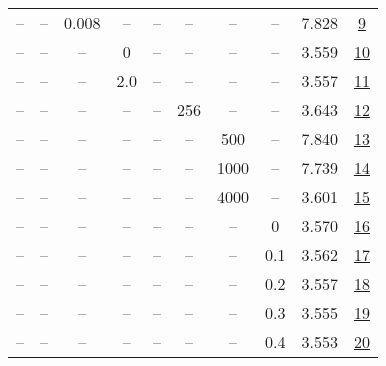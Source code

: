 \begin{table}[H]
\begin{tabular}{cccccccccc}
-- & -- & 0.008 & -- & -- & -- & -- & -- & 7.828 & \href{https://wandb.ai/stanford-mercury/optimizer-scaling/runs/sweep-130m-2B-lionaa59dalr0.008-wd0.7-minlr0-warmup2000-b10.9-b2-37a612}{9} \\
-- & -- & -- & 0 & -- & -- & -- & -- & 3.559 & \href{https://wandb.ai/stanford-mercury/optimizer-scaling/runs/sweep-130m-2B-lionf16ceclr0.002-wd0.7-minlr0-warmup2000-b10.9-b2-3511a1}{10} \\
-- & -- & -- & 2.0 & -- & -- & -- & -- & 3.557 & \href{https://wandb.ai/stanford-mercury/optimizer-scaling/runs/sweep-130m-2B-lion393849lr0.002-wd0.7-minlr0-warmup2000-b10.9-b2-41288e}{11} \\
-- & -- & -- & -- & -- & 256 & -- & -- & 3.643 & \href{https://wandb.ai/stanford-mercury/optimizer-scaling/runs/sweep-130m-2B-lion8ae51alr0.002-wd0.7-minlr0-warmup2000-b10.9-b2-8365f3}{12} \\
-- & -- & -- & -- & -- & -- & 500 & -- & 7.840 & \href{https://wandb.ai/stanford-mercury/optimizer-scaling/runs/sweep-130m-2B-lion343148lr0.002-wd0.7-minlr0-warmup500-b10.9-b20-25afde}{13} \\
-- & -- & -- & -- & -- & -- & 1000 & -- & 7.739 & \href{https://wandb.ai/stanford-mercury/optimizer-scaling/runs/sweep-130m-2B-liona9ab24lr0.002-wd0.7-minlr0-warmup1000-b10.9-b2-2a731e}{14} \\
-- & -- & -- & -- & -- & -- & 4000 & -- & 3.601 & \href{https://wandb.ai/stanford-mercury/optimizer-scaling/runs/sweep-130m-2B-lionea298blr0.002-wd0.7-minlr0-warmup4000-b10.9-b2-db95d5}{15} \\
-- & -- & -- & -- & -- & -- & -- & 0 & 3.570 & \href{https://wandb.ai/stanford-mercury/optimizer-scaling/runs/sweep-130m-2B-lion148492lr0.002-wd0-minlr0-warmup2000-b10.9-b20.-110cc7}{16} \\
-- & -- & -- & -- & -- & -- & -- & 0.1 & 3.562 & \href{https://wandb.ai/stanford-mercury/optimizer-scaling/runs/sweep-130m-2B-lion18acaelr0.002-wd0.1-minlr0-warmup2000-b10.9-b2-7ddf09}{17} \\
-- & -- & -- & -- & -- & -- & -- & 0.2 & 3.557 & \href{https://wandb.ai/stanford-mercury/optimizer-scaling/runs/sweep-130m-2B-lion1e546elr0.002-wd0.2-minlr0-warmup2000-b10.9-b2-aa9725}{18} \\
-- & -- & -- & -- & -- & -- & -- & 0.3 & 3.555 & \href{https://wandb.ai/stanford-mercury/optimizer-scaling/runs/sweep-130m-2B-liond40922lr0.002-wd0.3-minlr0-warmup2000-b10.9-b2-100dbc}{19} \\
-- & -- & -- & -- & -- & -- & -- & 0.4 & 3.553 & \href{https://wandb.ai/stanford-mercury/optimizer-scaling/runs/sweep-130m-2B-lionee963alr0.002-wd0.4-minlr0-warmup2000-b10.9-b2-c0140d}{20} \\

\end{tabular}
\end{table}
